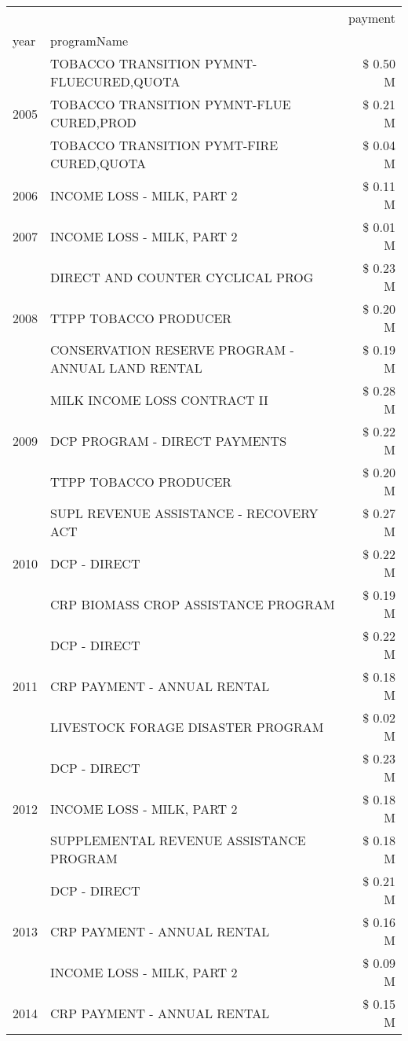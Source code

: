 \begin{tabular}{llr}
\toprule
 &  & payment \\
year & programName &  \\
\midrule
\multirow[t]{3}{*}{2005} & TOBACCO TRANSITION PYMNT-FLUECURED,QUOTA & \$ 0.50 M \\
 & TOBACCO TRANSITION PYMNT-FLUE CURED,PROD & \$ 0.21 M \\
 & TOBACCO TRANSITION PYMT-FIRE CURED,QUOTA & \$ 0.04 M \\
\cline{1-3}
2006 & INCOME LOSS - MILK, PART 2 & \$ 0.11 M \\
\cline{1-3}
2007 & INCOME LOSS - MILK, PART 2 & \$ 0.01 M \\
\cline{1-3}
\multirow[t]{3}{*}{2008} & DIRECT AND COUNTER CYCLICAL PROG & \$ 0.23 M \\
 & TTPP TOBACCO PRODUCER & \$ 0.20 M \\
 & CONSERVATION RESERVE PROGRAM - ANNUAL LAND RENTAL & \$ 0.19 M \\
\cline{1-3}
\multirow[t]{3}{*}{2009} & MILK INCOME LOSS CONTRACT II & \$ 0.28 M \\
 & DCP PROGRAM - DIRECT PAYMENTS & \$ 0.22 M \\
 & TTPP TOBACCO PRODUCER & \$ 0.20 M \\
\cline{1-3}
\multirow[t]{3}{*}{2010} & SUPL REVENUE ASSISTANCE - RECOVERY ACT & \$ 0.27 M \\
 & DCP - DIRECT & \$ 0.22 M \\
 & CRP BIOMASS CROP ASSISTANCE PROGRAM & \$ 0.19 M \\
\cline{1-3}
\multirow[t]{3}{*}{2011} & DCP - DIRECT & \$ 0.22 M \\
 & CRP PAYMENT - ANNUAL RENTAL & \$ 0.18 M \\
 & LIVESTOCK FORAGE DISASTER PROGRAM & \$ 0.02 M \\
\cline{1-3}
\multirow[t]{3}{*}{2012} & DCP - DIRECT & \$ 0.23 M \\
 & INCOME LOSS - MILK, PART 2 & \$ 0.18 M \\
 & SUPPLEMENTAL REVENUE ASSISTANCE PROGRAM & \$ 0.18 M \\
\cline{1-3}
\multirow[t]{3}{*}{2013} & DCP - DIRECT & \$ 0.21 M \\
 & CRP PAYMENT - ANNUAL RENTAL & \$ 0.16 M \\
 & INCOME LOSS - MILK, PART 2 & \$ 0.09 M \\
\cline{1-3}
\multirow[t]{3}{*}{2014} & CRP PAYMENT - ANNUAL RENTAL & \$ 0.15 M \\

\end{tabular}
